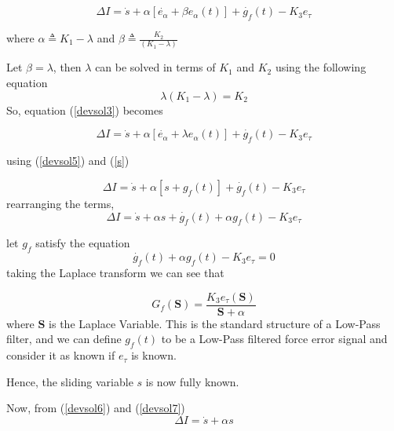 \documentclass[letterpaper, 10 pt, conference]{ieeeconf}  %
\begin{document}
\begin{equation} \label{devsol3}
    \Delta I = \dot s + \alpha [\dot{e_\alpha} + \beta e_\alpha(t)] 
    + \dot{g_f}(t) - K_3 e_{\tau}
\end{equation}


where $\alpha \triangleq K_1 - \lambda$ and $\beta \triangleq \frac{K_2}{(K_1 - \lambda)}$

Let $\beta = \lambda$, then $\lambda$ can be solved in terms of $K_1$ and $K_2$ using the following equation  
\begin{equation} \label{devsol4}
    \lambda(K_1 - \lambda) = K_2
\end{equation}
So, equation (\ref{devsol3}) becomes

\begin{equation} \label{devsol5}
    \Delta I = \dot s + \alpha [\dot{e_\alpha} + \lambda e_\alpha(t)] 
    + \dot{g_f}(t) - K_3 e_{\tau}
\end{equation}

using (\ref{devsol5}) and (\ref{s})

\begin{equation} 
    \Delta I = \dot s + \alpha [s + g_f(t)] 
    + \dot{g_f}(t) - K_3 e_{\tau}
\end{equation}
rearranging the terms,
\begin{equation} \label{devsol6}
    \Delta I = \dot s + \alpha s +\dot{g_f}(t) + \alpha g_f(t) - K_3 e_{\tau}
\end{equation}

let $g_f$ satisfy the equation
\begin{equation} \label{gf_dyn}
    \dot{g_f}(t) + \alpha g_f(t) - K_3 e_{\tau} = 0
\end{equation}
taking the Laplace transform we can see that

\begin{equation}
    G_f(\boldsymbol{S}) = \frac{K_3 e_{\tau}(\boldsymbol{S})}{\boldsymbol{S} + \alpha}
\end{equation}
where $\boldsymbol{S}$ is the Laplace Variable.
This is the standard structure of a Low-Pass filter, and we can define $g_f(t)$ to be a Low-Pass filtered force error signal and consider it as known if $e_{\tau}$ is known.

Hence, the sliding variable $s$ is now fully known.

Now, from (\ref{devsol6}) and (\ref{devsol7}) 
\begin{equation} \label{deviation_error2}
    \Delta I = \dot s + \alpha s
\end{equation}
\end{document}
